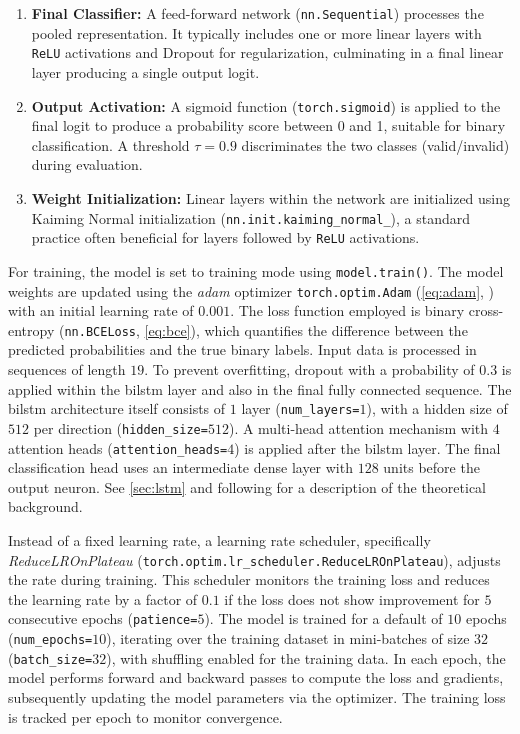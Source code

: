 \begin{enumerate}
  \item \textbf{Final Classifier:} A feed-forward network (\texttt{nn.Sequential}) processes the pooled representation. It typically includes one or more linear layers with \texttt{ReLU} activations and Dropout for regularization, culminating in a final linear layer producing a single output logit.

  \item \textbf{Output Activation:} A sigmoid function (\texttt{torch.sigmoid}) is applied to the final logit to produce a probability score between 0 and 1, suitable for binary classification. A threshold $\tau = 0.9$ discriminates the two classes (valid/invalid) during evaluation.

  \item \textbf{Weight Initialization:} Linear layers within the network are initialized using Kaiming Normal initialization (\texttt{nn.init.kaiming\_normal\_}), a standard practice often beneficial for layers followed by \texttt{ReLU} activations.
\end{enumerate}

For training, the model is set to training mode using \texttt{model.train()}. The model weights are updated using the \textit{\gls{adam}} optimizer \texttt{torch.optim.Adam} (\autoref{eq:adam}, \autocite{kingma2014adam}) with an initial learning rate of $0.001$. The loss function employed is binary cross-entropy (\texttt{nn.BCELoss}, \autoref{eq:bce}), which quantifies the difference between the predicted probabilities and the true binary labels. Input data is processed in sequences of length $19$. To prevent overfitting, dropout with a probability of $0.3$ is applied within the \gls{bilstm} layer and also in the final fully connected sequence. The \gls{bilstm} architecture itself consists of $1$ layer (\texttt{num\_layers=$1$}), with a hidden size of $512$ per direction (\texttt{hidden\_size=$512$}). A multi-head attention mechanism with $4$ attention heads (\texttt{attention\_heads=$4$}) is applied after the \gls{bilstm} layer. The final classification head uses an intermediate dense layer with $128$ units before the output neuron. See \autoref{sec:lstm} and following for a description of the theoretical background.

Instead of a fixed learning rate, a learning rate scheduler, specifically \textit{ReduceLROnPlateau} (\texttt{torch.optim.lr\_scheduler.ReduceLROnPlateau}), adjusts the rate during training. This scheduler monitors the training loss and reduces the learning rate by a factor of $0.1$ if the loss does not show improvement for $5$ consecutive epochs (\texttt{patience=$5$}). The model is trained for a default of $10$ epochs (\texttt{num\_epochs=$10$}), iterating over the training dataset in mini-batches of size $32$ (\texttt{batch\_size=$32$}), with shuffling enabled for the training data. In each epoch, the model performs forward and backward passes to compute the loss and gradients, subsequently updating the model parameters via the optimizer. The training loss is tracked per epoch to monitor convergence.

